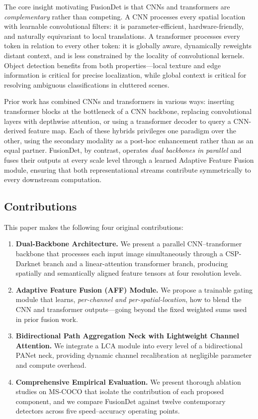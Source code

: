The core insight motivating FusionDet is that CNNs and transformers
are \textit{complementary} rather than competing. A CNN processes
every spatial location with learnable convolutional filters: it is
parameter-efficient, hardware-friendly, and naturally equivariant to
local translations. A transformer processes every token in relation
to every other token: it is globally aware, dynamically reweights
distant context, and is less constrained by the locality of
convolutional kernels. Object detection benefits from both
properties---local texture and edge information is critical for
precise localization, while global context is critical for resolving
ambiguous classifications in cluttered scenes.

Prior work has combined CNNs and transformers in various ways:
inserting transformer blocks at the bottleneck of a CNN backbone,
replacing convolutional layers with depthwise attention, or using
a transformer decoder to query a CNN-derived feature map. Each of
these hybrids privileges one paradigm over the other, using the
secondary modality as a post-hoc enhancement rather than as an equal
partner. FusionDet, by contrast, operates \textit{dual backbones in
parallel} and fuses their outputs at every scale level through a
learned Adaptive Feature Fusion module, ensuring that both
representational streams contribute symmetrically to every
downstream computation.

\subsection{Contributions}
\label{sec:contributions}

This paper makes the following four original contributions:

\begin{enumerate}
  \item \textbf{Dual-Backbone Architecture.} We present a parallel
    CNN--transformer backbone that processes each input image
    simultaneously through a CSP-Darknet branch and a linear-attention
    transformer branch, producing spatially and semantically aligned
    feature tensors at four resolution levels.

  \item \textbf{Adaptive Feature Fusion (AFF) Module.} We propose a
    trainable gating module that learns, \textit{per-channel and
    per-spatial-location}, how to blend the CNN and transformer
    outputs---going beyond the fixed weighted sums used in prior
    fusion work.

  \item \textbf{Bidirectional Path Aggregation Neck with Lightweight
    Channel Attention.} We integrate a LCA module into every level of
    a bidirectional PANet neck, providing dynamic channel
    recalibration at negligible parameter and compute overhead.

  \item \textbf{Comprehensive Empirical Evaluation.} We present
    thorough ablation studies on MS-COCO that isolate the contribution
    of each proposed component, and we compare FusionDet against
    twelve contemporary detectors across five speed--accuracy
    operating points.
\end{enumerate}

